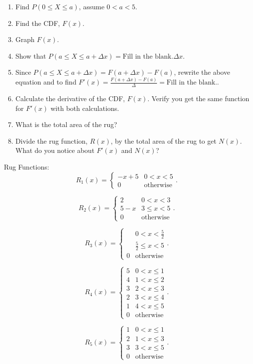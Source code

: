 \documentclass[letterpaper,oneside]{book}%
\theoremstyle{plain}
\theoremstyle{box}
\theoremstyle{problem}
\begin{document}
\begin{enumerate}
\item Find $P(0 \leq X \leq a)$, assume $0 < a < 5$.
\item Find the CDF, $F(x)$.
\item Graph $F(x)$.
\item Show that $P(a \leq X \leq a + \Delta x) = \text{Fill in the blank.} \Delta x$.
\item Since $P(a \leq X \leq a + \Delta x) = F(a + \Delta x) - F(a)$, rewrite the above equation and to find $F'(x) = \frac{F(a + \Delta x) - F(a)}{\Delta} = \text{Fill in the blank.}$.
\item Calculate the derivative of the CDF, $F(x)$. Verify you get the same function for $F'(x)$ with both calculations.
\item What is the total area of the rug?
\item Divide the rug function, $R(x)$, by the total area of the rug to get $N(x)$. What do you notice about $F'(x)$ and $N(x)$?
\end{enumerate}

Rug Functions:
$$R_1(x) = 
    \begin{cases}
    -x + 5 & 0 < x < 5 \\
    0 & \text{otherwise}
    \end{cases}.$$

$$R_2(x) = 
    \begin{cases}
    2 & 0 < x < 3 \\
    5 - x & 3 \leq x < 5 \\
    0 & \text{otherwise}
    \end{cases}.$$

$$R_3(x) = 
    \begin{cases}
     & 0 < x < \frac{5}{2} \\
     & \frac{5}{2} \leq x < 5 \\
    0 & \text{otherwise}
    \end{cases}.$$

$$R_4(x) = 
    \begin{cases}
    5 & 0 < x \leq 1 \\
    4 & 1 < x \leq 2 \\
    3 & 2 < x \leq 3 \\
    2 & 3 < x \leq 4 \\
    1 & 4 < x \leq 5 \\
    0 & \text{otherwise}
    \end{cases}.$$

$$R_5(x) = 
    \begin{cases}
    1 & 0 < x \leq 1 \\
    2 & 1 < x \leq 3 \\
    3 & 3 < x \leq 5 \\
    0 & \text{otherwise}
    \end{cases}.$$
\end{document}
